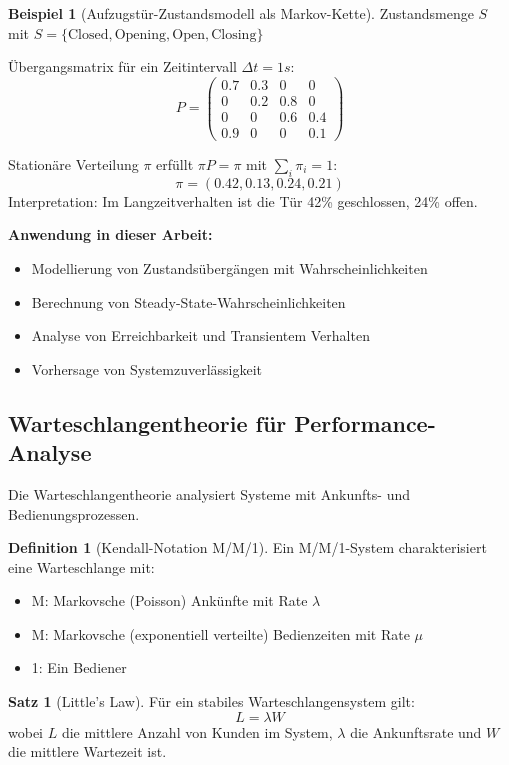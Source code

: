 ﻿\documentclass[a4paper,12pt]{scrreprt}
\theoremstyle{definition}
\newtheorem{definition}{Definition}[section]
\newtheorem{beispiel}{Beispiel}[section]
\newtheorem{satz}{Satz}[section]
\begin{document}
\begin{beispiel}[Aufzugstür-Zustandsmodell als Markov-Kette]
	Zustandsmenge $S$ mit $S = \{\text{Closed}, \text{Opening}, \text{Open}, \text{Closing}\}$
	
	Übergangsmatrix für ein Zeitintervall $\Delta t = 1s$:
	\[
	P = \begin{pmatrix}
		0.7 & 0.3 & 0 & 0 \\
		0 & 0.2 & 0.8 & 0 \\
		0 & 0 & 0.6 & 0.4 \\
		0.9 & 0 & 0 & 0.1
	\end{pmatrix}
	\]
	
	Stationäre Verteilung $\pi$ erfüllt $\pi P = \pi$ mit $\sum_i \pi_i = 1$:
	\[
	\pi = (0.42, 0.13, 0.24, 0.21)
	\]
	Interpretation: Im Langzeitverhalten ist die Tür 42\% geschlossen, 24\% offen.
\end{beispiel}

\textbf{Anwendung in dieser Arbeit:}
\begin{itemize}
	\item[-] Modellierung von Zustandsübergängen mit Wahrscheinlichkeiten
	\item[-] Berechnung von Steady-State-Wahrscheinlichkeiten
	\item[-] Analyse von Erreichbarkeit und Transientem Verhalten
	\item[-] Vorhersage von Systemzuverlässigkeit
\end{itemize}

\subsection{Warteschlangentheorie für Performance-Analyse}

Die Warteschlangentheorie \cite{kleinrock1975} analysiert Systeme mit Ankunfts- und Bedienungsprozessen.

\begin{definition}[Kendall-Notation M/M/1]
	Ein M/M/1-System charakterisiert eine Warteschlange mit:
	\begin{itemize}
		\item[-] M: Markovsche (Poisson) Ankünfte mit Rate $\lambda$
		\item[-] M: Markovsche (exponentiell verteilte) Bedienzeiten mit Rate $\mu$
		\item[-] 1: Ein Bediener
	\end{itemize}
\end{definition}

\begin{satz}[Little's Law]
	Für ein stabiles Warteschlangensystem gilt:
	\[
	L = \lambda W
	\]
	wobei $L$ die mittlere Anzahl von Kunden im System, $\lambda$ die Ankunftsrate und $W$ die mittlere Wartezeit ist.
\end{satz}
\end{document}

